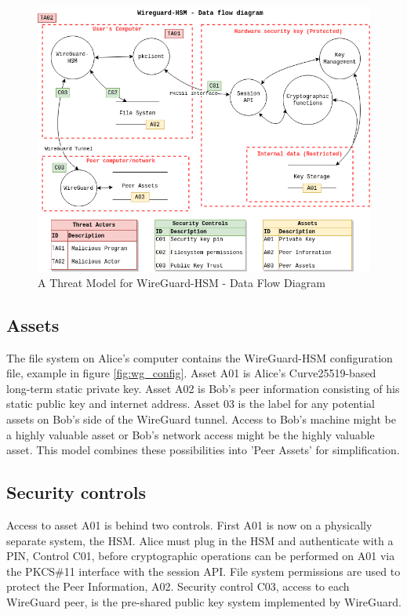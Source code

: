 \documentclass [11pt, proquest] {uwthesis}[2020/02/24]
\begin{document}
\begin{figure}[ht]
\includegraphics[width=14cm]{paper/images/WGHSM_DFD.png}
\caption{A Threat Model for WireGuard-HSM - Data Flow Diagram}
\label{fig:wg_hsm_dfd}
\end{figure}

\subsection{Assets}
The file system on Alice's computer contains the WireGuard-HSM configuration file, example in figure \ref{fig:wg_config}. 
Asset A01 is Alice's Curve25519-based long-term static private key. Asset A02 is Bob's peer information consisting of his static public key and internet address.
Asset 03 is the label for any potential assets on Bob's side of the WireGuard tunnel. Access to Bob's machine might be a highly valuable asset or Bob's network access might be the highly valuable asset. This model combines these possibilities into 'Peer Assets' for simplification.

\subsection{Security controls}
Access to asset A01 is behind two controls. First A01 is now on a physically separate system, the HSM. Alice must plug in the HSM and authenticate with a PIN, Control C01, before cryptographic operations can be performed on A01 via the PKCS\#11 interface with the session API.
File system permissions are used to protect the Peer Information, A02.
Security control C03, access to each WireGuard peer, is the pre-shared public key system implemented by WireGuard.
\end{document}
